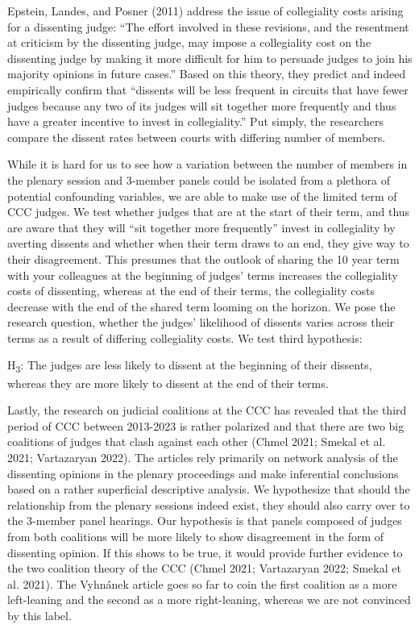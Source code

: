 \documentclass[
  11pt,
]{article}
\begin{document}
Epstein, Landes, and Posner (2011) address the issue of collegiality
costs arising for a dissenting judge: ``The effort involved in these
revisions, and the resentment at criticism by the dissenting judge, may
impose a collegiality cost on the dissenting judge by making it more
difficult for him to persuade judges to join his majority opinions in
future cases.'' Based on this theory, they predict and indeed
empirically confirm that ``dissents will be less frequent in circuits
that have fewer judges because any two of its judges will sit together
more frequently and thus have a greater incentive to invest in
collegiality.'' Put simply, the researchers compare the dissent rates
between courts with differing number of members.

While it is hard for us to see how a variation between the number of
members in the plenary session and 3-member panels could be isolated
from a plethora of potential confounding variables, we are able to make
use of the limited term of CCC judges. We test whether judges that are
at the start of their term, and thus are aware that they will ``sit
together more frequently'' invest in collegiality by averting dissents
and whether when their term draws to an end, they give way to their
disagreement. This presumes that the outlook of sharing the 10 year term
with your colleagues at the beginning of judges' terms increases the
collegiality costs of dissenting, whereas at the end of their terms, the
collegiality costs decrease with the end of the shared term looming on
the horizon. We pose the research question, whether the judges'
likelihood of dissents varies across their terms as a result of
differing collegiality costs. We test third hypothesis:

H\textsubscript{3}: The judges are less likely to dissent at the
beginning of their dissents, whereas they are more likely to dissent at
the end of their terms.

Lastly, the research on judicial coalitions at the CCC has revealed that
the third period of CCC between 2013-2023 is rather polarized and that
there are two big coalitions of judges that clash against each other
(Chmel 2021; Smekal et al. 2021; Vartazaryan 2022). The articles rely
primarily on network analysis of the dissenting opinions in the plenary
proceedings and make inferential conclusions based on a rather
superficial descriptive analysis. We hypothesize that should the
relationship from the plenary sessions indeed exist, they should also
carry over to the 3-member panel hearings. Our hypothesis is that panels
composed of judges from both coalitions will be more likely to show
disagreement in the form of dissenting opinion. If this shows to be
true, it would provide further evidence to the two coalition theory of
the CCC (Chmel 2021; Vartazaryan 2022; Smekal et al. 2021). The Vyhnánek
article goes so far to coin the first coalition as a more left-leaning
and the second as a more right-leaning, whereas we are not convinced by
this label.
\end{document}
